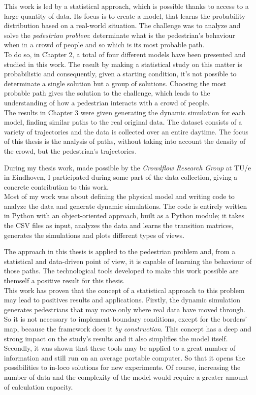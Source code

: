 \documentclass[class=article, crop=false]{standalone}
\begin{document}

This work is led by a statistical approach, which is possible thanks to access to a large quantity of data.
Its focus is to create a model, that learns the probability distribution based on a real-world situation.
The challenge was to analyze and solve the \emph{pedestrian problem}: determinate what is the pedestrian's behaviour when in a crowd of people and so which is its most probable path.
\\To do so, in Chapter 2, a total of four different models have been presented and studied in this work.
The result by making a statistical study on this matter is probabilistic and consequently, given a starting condition, it's not possible to determinate a single solution but a group of solutions.
Choosing the most probable path gives the solution to the challenge, which leads to the understanding of how a pedestrian interacts with a crowd of people.
\\The results in Chapter 3 were given generating the dynamic simulation for each model, finding similar paths to the real original data.
The dataset consists of a variety of trajectories and the data is collected over an entire daytime.
The focus of this thesis is the analysis of paths, without taking into account the density of the crowd, but the pedestrian's trajectories.

During my thesis work, made possible by the \emph{Crowdflow Research Group} at TU/e in Eindhoven, I participated during some part of the data collection, giving a concrete contribution to this work.
\\Most of my work was about defining the physical model and writing code \cite{repoPIA} to analyze the data and generate dynamic simulations.
The code is entirely written in Python with an object-oriented approach, built as a Python module;
it takes the CSV files as input, analyzes the data and learns the transition matrices, generates the simulations and plots different types of views.

The approach in this thesis is applied to the pedestrian problem and, from a statistical and data-driven point of view, it is capable of learning the behaviour of those paths.
The technological tools developed to make this work possible are themself a positive result for this thesis.
\\This work has proven that the concept of a statistical approach to this problem may lead to positives results and applications.
Firstly, the dynamic simulation generates pedestrians that may move only where real data have moved through.
So it is not necessary to implement boundary conditions, except for the borders' map, because the framework does it \emph{by construction}.
This concept has a deep and strong impact on the study's results and it also simplifies the model itself.
Secondly, it was shown that these tools may be applied to a great number of information and still run on an average portable computer.
So that it opens the possibilities to in-loco solutions for new experiments.
Of course, increasing the number of data and the complexity of the model would require a greater amount of calculation capacity.
\end{document}

